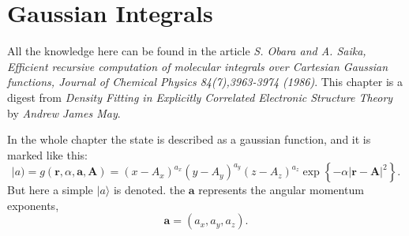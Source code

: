 \chapter{Gaussian Integrals}

All the knowledge here can be found in the article \emph{S. Obara and A. Saika, Efficient recursive computation of molecular integrals over Cartesian Gaussian functions, Journal of Chemical Physics 84(7),3963-3974 (1986)}. This chapter is a digest from \emph{Density Fitting in Explicitly Correlated Electronic Structure Theory} by \emph{Andrew James May}.

In the whole chapter the state is described as a gaussian function, and it is marked like this:
\begin{equation} 
	|a ) = g(\boldsymbol{r}, \alpha, \boldsymbol{a} ,\boldsymbol{A} ) = (x-A_x)^{a_x} (y-A_y)^{a_y} (z-A_z)^{a_z} \exp \left\{ - \alpha | \boldsymbol{r} - \boldsymbol{A} |^2  \right\}. 
\end{equation}  
But here a simple $| a \rangle $ is denoted. the  $\boldsymbol{a}$ represents the angular momentum exponents,
\[
	\boldsymbol{a} = (a_x,a_y,a_z)
.\] 

